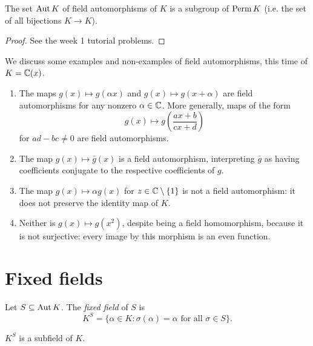 \begin{proposition}
    The set $\operatorname{Aut}{K}$ of field automorphisms of $K$ is a subgroup of $\operatorname{Perm}{K}$ (i.e. the set of all bijections $K \to K$).
\end{proposition}

\begin{proof}
    See the week 1 tutorial problems.
\end{proof}

\begin{example}
    We discuss some examples and non-examples of field automorphisms, this time of $K = \mathbb{{C}}(x)$.
    \begin{enumerate}
        \item The maps $g(x) \longmapsto g(\alpha x)$ and $g(x) \longmapsto g(x + \alpha)$ are field automorphisms for any nonzero $\alpha \in \mathbb{{C}}$. More generally, maps of the form
        \[
            g(x) \longmapsto g\left(\frac{ax + b}{cx + d}\right)
        \]
        for $ad - bc \neq 0$ are field automorphisms.
        
        \item The map $g(x) \longmapsto \overline{g}(x)$ is a field automorphism, interpreting $\overline{g}$ as having coefficients conjugate to the respective coefficients of $g$.
        
        \item The map $g(x) \longmapsto \alpha g(x)$ for $z \in \mathbb{{C}} \setminus \{1\}$ is not a field automorphism: it does not preserve the identity map of $K$.

        \item Neither is $g(x) \longmapsto g(x^2)$, despite being a field homomorphism, because it is not surjective: every image by this morphism is an even function.
    \end{enumerate}
\end{example}

\section{Fixed fields}

\begin{definition}
    Let $S \subseteq \operatorname{Aut}{K}$. The \emph{fixed field} of $S$ is
    \[
        K^S = \{\alpha \in K: \sigma(\alpha) = \alpha \text{ for all } \sigma \in S\}.
    \]
\end{definition}

\begin{proposition}
    $K^S$ is a subfield of $K$.
\end{proposition}

